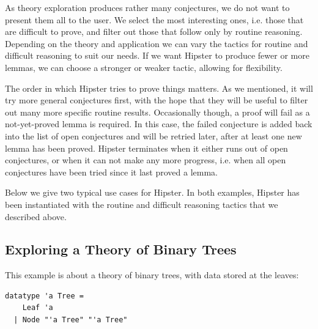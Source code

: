 As theory exploration produces rather many conjectures, we do not want
to present them all to the user. We select the most
interesting ones, i.e. those that are difficult to prove, and filter out those that follow only by routine reasoning.
Depending on the theory and application we can vary the tactics for routine and difficult reasoning to suit our needs. If we want Hipster to produce fewer or more lemmas, we can choose a stronger or weaker tactic, allowing for flexibility.

The order in which Hipster tries to prove things matters. As we
mentioned, it will try more general conjectures first, with the hope
that they will be useful to filter out many more specific routine
results. Occasionally though, a proof will fail as a not-yet-proved
lemma is required. In this case, the failed conjecture is added back
into the list of open conjectures and will be retried later, after at
least one new lemma has been proved. Hipster terminates when it either
runs out of open conjectures, or when it can not make any more
progress, i.e. when all open conjectures have been tried since it last proved a lemma.

Below we give two typical use cases for Hipster. In both examples,
Hipster has been instantiated with the routine and difficult reasoning
tactics that we described above.

\subsection{Exploring a Theory of Binary Trees}
\label{sec:tree}
This example is about a theory of binary trees, with data stored at the leaves:
\begin{small}
\begin{verbatim}
datatype 'a Tree = 
    Leaf 'a 
  | Node "'a Tree" "'a Tree"
\end{verbatim}
\end{small}

